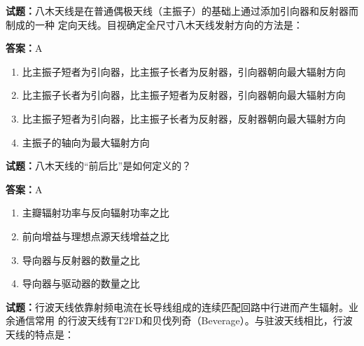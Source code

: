 \documentclass{ctexbook}
\begin{document}




\vspace{1em}

\textbf{试题：}八木天线是在普通偶极天线（主振子）的基础上通过添加引向器和反射器而制成的一种
定向天线。目视确定全尺寸八木天线发射方向的方法是： 

\textbf{答案：}A 

\begin{enumerate}[leftmargin=3em]
  \item 比主振子短者为引向器，比主振子长者为反射器，引向器朝向最大辐射方向 

  \item 比主振子长者为引向器，比主振子短者为反射器，引向器朝向最大辐射方向 

  \item 比主振子短者为引向器，比主振子长者为反射器，反射器朝向最大辐射方向 

  \item 主振子的轴向为最大辐射方向 

\end{enumerate}





\vspace{1em}

\textbf{试题：}八木天线的“前后比”是如何定义的？ 

\textbf{答案：}A 

\begin{enumerate}[leftmargin=3em]
  \item 主瓣辐射功率与反向辐射功率之比 

  \item 前向增益与理想点源天线增益之比 

  \item 导向器与反射器的数量之比 

  \item 导向器与驱动器的数量之比 

\end{enumerate}





\vspace{1em}

\textbf{试题：}行波天线依靠射频电流在长导线组成的连续匹配回路中行进而产生辐射。业余通信常用
的行波天线有T2FD和贝伐列奇（Beverage）。与驻波天线相比，行波天线的特点是： 
\end{document}
